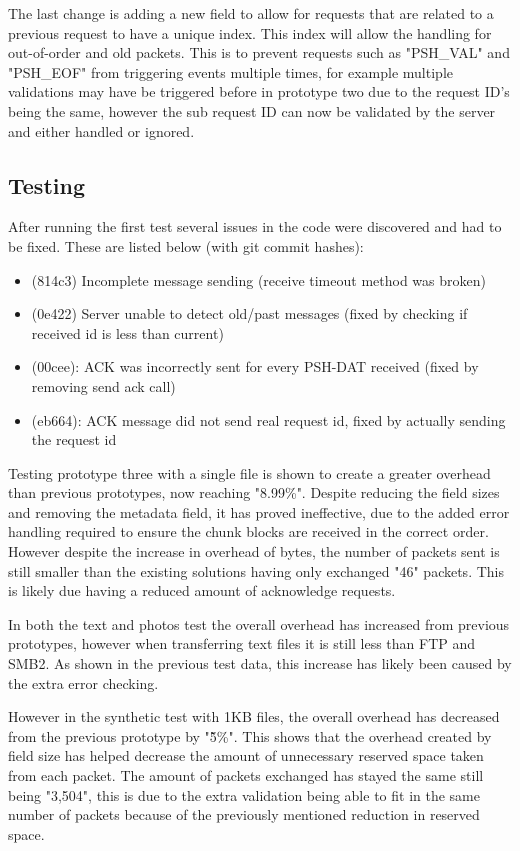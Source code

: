 The last change is adding a new field to allow for requests that are related to a previous request to have a unique index. This index will allow the handling for out-of-order and old packets. This is to prevent requests such as "PSH\_VAL" and "PSH\_EOF" from triggering events multiple times, for example multiple validations may have be triggered before in prototype two due to the request ID's being the same, however the sub request ID can now be validated by the server and either handled or ignored.

\subsection*{Testing}
After running the first test several issues in the code were discovered and had to be fixed. These are listed below (with git commit hashes):

\begin{itemize}
    \item (814c3) Incomplete message sending (receive timeout method was broken)
    \item (0e422) Server unable to detect old/past messages (fixed by checking if received id is less than current)
    \item (00cee): ACK was incorrectly sent for every PSH-DAT received (fixed by removing send ack call)
    \item (eb664): ACK message did not send real request id, fixed by actually sending the request id
\end{itemize}

Testing prototype three with a single file is shown to create a greater overhead than previous prototypes, now reaching "8.99\%". Despite reducing the field sizes and removing the metadata field, it has proved ineffective, due to the added error handling required to ensure the chunk blocks are received in the correct order. However despite the increase in overhead of bytes, the number of packets sent is still smaller than the existing solutions having only exchanged "46" packets. This is likely due having a reduced amount of acknowledge requests.

In both the text and photos test the overall overhead has increased from previous prototypes, however when transferring text files it is still less than FTP and SMB2. As shown in the previous test data, this increase has likely been caused by the extra error checking.

However in the synthetic test with 1KB files, the overall overhead has decreased from the previous prototype by "\~5\%". This shows that the overhead created by field size has helped decrease the amount of unnecessary reserved space taken from each packet. The amount of packets exchanged has stayed the same still being "3,504", this is due to the extra validation being able to fit in the same number of packets because of the previously mentioned reduction in reserved space.

